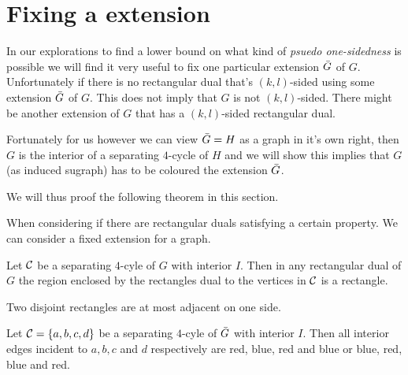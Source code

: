 
\section{Fixing a extension}
In our explorations to find a lower bound on what kind of \emph{psuedo one-sidedness} is possible we will find it very useful to fix one particular extension $\bar{G}$ of $G$. Unfortunately if there is no rectangular dual that’s $(k,l)$-sided using some extension $\bar{G}$ of $G$. This does not imply that $G$ is not $(k,l)$-sided. There might be another extension of $G$ that has a $(k,l)$-sided rectangular dual.

Fortunately for us however we can view $\bar{G} = H$ as a graph in it's own right, then $G$ is the interior of a separating $4$-cycle of $H$ and we will show this implies that $G$ (as induced sugraph) has to be coloured  the extension $\bar{G}$.

We will thus proof the following theorem in this section.
\begin{thrm}
\label{th:fixExtension}
When considering if there are rectangular duals satisfying a certain property. We can consider a fixed extension for a graph.
\end{thrm}

\begin{remark}
\label{re:interiorRectangle}
Let $\mathcal{C}$ be a separating $4$-cyle of $G$ with interior $I$. Then in any rectangular dual of $G$ the region enclosed by the rectangles dual to the vertices in $\mathcal{C}$ is a rectangle.
\end{remark}

\begin{remark}
\label{re:disjointRectanglesOnlyHaveOneAdjecentSide}
Two disjoint rectangles are at most adjacent on one side.
\end{remark}

\begin{lemma}
\label{lm:fourCycleUnicolor}
Let $\mathcal{C} = \left\lbrace {a, b, c, d} \right\rbrace$ be a separating $4$-cyle of $\bar{G}$ with interior $I$. Then all interior edges incident to $a, b, c$ and $d$ respectively are red, blue, red and blue or blue, red, blue and red.
\end{lemma}

